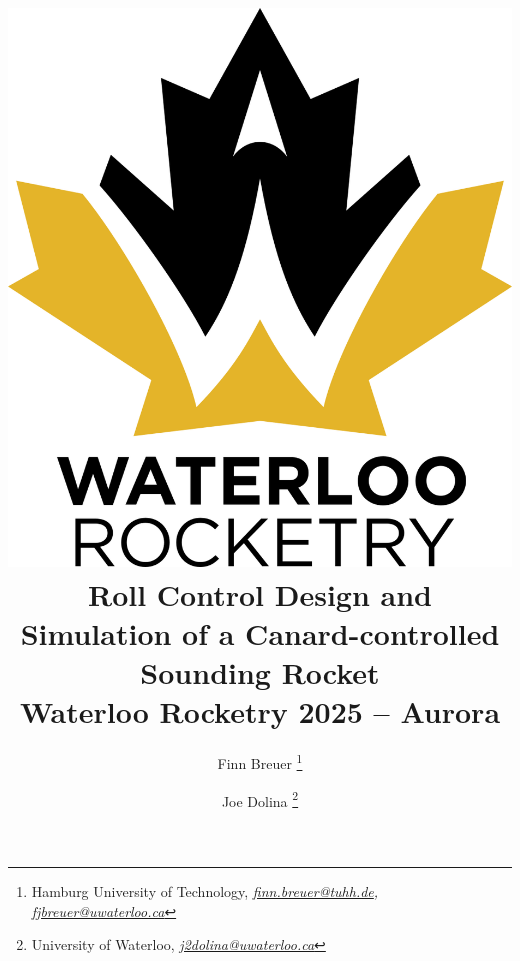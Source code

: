 \documentclass[a4paper, 12pt]{report}
\begin{document}


\title{
\includegraphics[scale=1.4]{images/colour_standard.png}
\\[1em] \Huge \bfseries
{Roll Control Design and Simulation of a Canard-controlled Sounding Rocket}
\\[1em] \Large \mdseries 
{Waterloo Rocketry 2025 -- Aurora}
}
\author{
Finn Breuer \footnote{ Hamburg University of Technology, \quad \itshape \href{mailto:finn.breuer@tuhh.de}{finn.breuer@tuhh.de},  \href{mailto:fjbreuer@uwaterloo.ca}{fjbreuer@uwaterloo.ca}} 
\and 
Joe Dolina \footnote{ University of Waterloo, \quad \itshape \href{mailto:j2dolina@uwaterloo.ca}{j2dolina@uwaterloo.ca}}
}
\maketitle 

\tableofcontents
\listoffigures
\listoftables

\newpage
{}
\pagestyle{fancy}
\end{document}
